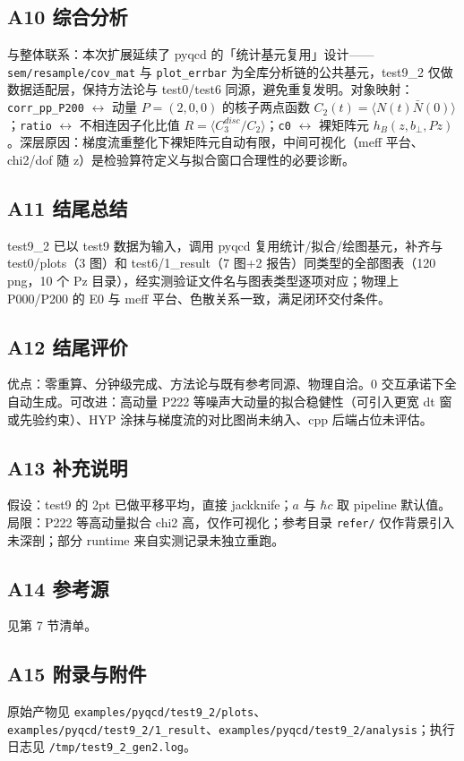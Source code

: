 \documentclass[UTF8]{ctexart}
\begin{document}
\subsection{A10 综合分析}
与整体联系：本次扩展延续了 pyqcd 的「统计基元复用」设计——\texttt{sem/resample/cov\_mat} 与 \texttt{plot\_errbar} 为全库分析链的公共基元，test9\_2 仅做数据适配层，保持方法论与 test0/test6 同源，避免重复发明。对象映射：\texttt{corr\_pp\_P200} $\leftrightarrow$ 动量 $P=(2,0,0)$ 的核子两点函数 $C_2(t)=\langle N(t) \bar N(0)\rangle$；\texttt{ratio} $\leftrightarrow$ 不相连因子化比值 $R=\langle C_3^{disc}/C_2\rangle$；\texttt{c0} $\leftrightarrow$ 裸矩阵元 $h_B(z,b_\perp,Pz)$。深层原因：梯度流重整化下裸矩阵元自动有限，中间可视化（meff 平台、chi2/dof 随 z）是检验算符定义与拟合窗口合理性的必要诊断。

\subsection{A11 结尾总结}
\begin{conclbox}
test9\_2 已以 test9 数据为输入，调用 pyqcd 复用统计/拟合/绘图基元，补齐与 test0/plots（3 图）和 test6/1\_result（7 图+2 报告）同类型的全部图表（120 png，10 个 Pz 目录），经实测验证文件名与图表类型逐项对应；物理上 P000/P200 的 E0 与 meff 平台、色散关系一致，满足闭环交付条件。
\end{conclbox}

\subsection{A12 结尾评价}
优点：零重算、分钟级完成、方法论与既有参考同源、物理自洽。0 交互承诺下全自动生成。可改进：高动量 P222 等噪声大动量的拟合稳健性（可引入更宽 dt 窗或先验约束）、HYP 涂抹与梯度流的对比图尚未纳入、cpp 后端占位未评估。

\subsection{A13 补充说明}
假设：test9 的 2pt 已做平移平均，直接 jackknife；$a$ 与 $\hbar c$ 取 pipeline 默认值。局限：P222 等高动量拟合 chi2 高，仅作可视化；参考目录 \texttt{refer/} 仅作背景引入未深剖；部分 runtime 来自实测记录未独立重跑。

\subsection{A14 参考源}
见第 7 节清单。

\subsection{A15 附录与附件}
原始产物见 \texttt{examples/pyqcd/test9\_2/plots}、\texttt{examples/pyqcd/test9\_2/1\_result}、\texttt{examples/pyqcd/test9\_2/analysis}；执行日志见 \texttt{/tmp/test9\_2\_gen2.log}。
\end{document}
